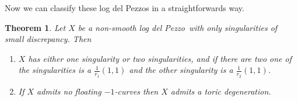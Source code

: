 \documentclass[12pt]{amsbook}
\theoremstyle{plain}
\newtheorem{thm}{Theorem}[section]
\newcommand{\ldp}{log del Pezzo}
\begin{document}
Now we can classify these log del Pezzos in a straightforwards way. 
\begin{thm}\label{ThmOnSing}
Let $X$ be a non-smooth \ldp\ with only singularities of small discrepancy. Then 
\begin{enumerate}
\item\label{thm38i}
$X$ has either one singularity or two singularities, and if there are two one of the singularities is a $\frac{1}{r_1}(1,1)$ and the other singularity is a $\frac{1}{r_2}(1,1)$.
\item\label{thm38ii}
If $X$ admits no floating $-1$-curves then $X$ admits a toric degeneration. %
\end{enumerate}
\end{thm}
\end{document}
